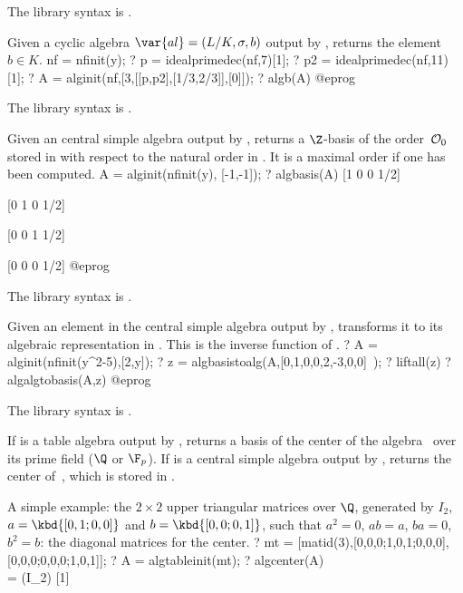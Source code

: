 The library syntax is .

\label{se:algb}
Given a cyclic algebra $\var{al} = (L/K,\sigma,b)$ output by
, returns the element $b\in K$.
\bprog
nf = nfinit(y);
? p = idealprimedec(nf,7)[1];
? p2 = idealprimedec(nf,11)[1];
? A = alginit(nf,[3,[[p,p2],[1/3,2/3]],[0]]);
? algb(A)
@eprog

The library syntax is .

\label{se:algbasis}
Given an central simple algebra  output by , returns
a $\Z$-basis of the order~${\cal O}_0$ stored in  with respect to the
natural order in . It is a maximal order if one has been computed.
\bprog
A = alginit(nfinit(y), [-1,-1]);
? algbasis(A)
[1 0 0 1/2]

[0 1 0 1/2]

[0 0 1 1/2]

[0 0 0 1/2]
@eprog

The library syntax is .

\label{se:algbasistoalg}
Given an element  in the central simple algebra  output
by , transforms it to its algebraic representation in .
This is the inverse function of .
\bprog
? A = alginit(nfinit(y^2-5),[2,y]);
? z = algbasistoalg(A,[0,1,0,0,2,-3,0,0]~);
? liftall(z)
? algalgtobasis(A,z)
@eprog

The library syntax is .

\label{se:algcenter}
If  is a table algebra output by , returns a
basis of the center of the algebra~ over its prime field ($\Q$ or
$\F_p$). If  is a central simple algebra output by ,
returns the center of~, which is stored in .

A simple example: the $2\times 2$ upper triangular matrices over $\Q$,
generated by $I_2$, $a = \kbd{[0,1;0,0]}$ and $b = \kbd{[0,0;0,1]}$,
such that $a^2 = 0$, $ab = a$, $ba = 0$, $b^2 = b$: the diagonal matrices
for the center.
\bprog
? mt = [matid(3),[0,0,0;1,0,1;0,0,0],[0,0,0;0,0,0;1,0,1]];
? A = algtableinit(mt);
? algcenter(A) \\ = (I_2)
[1]

